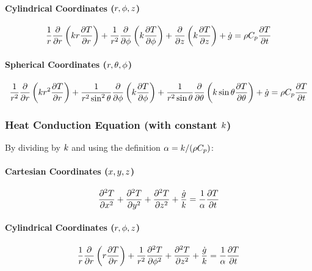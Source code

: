 \paragraph*{Cylindrical Coordinates ($r, \phi, z$)}
\begin{equation}
\label{eq:hce_cylindrical_variable_k_theory}
    \frac{1}{r} \frac{\partial}{\partial r}\left(k r \frac{\partial T}{\partial r}\right) + \frac{1}{r^2} \frac{\partial}{\partial \phi}\left(k \frac{\partial T}{\partial \phi}\right) + \frac{\partial}{\partial z}\left(k \frac{\partial T}{\partial z}\right) + \dot{g} = \rho C_p \frac{\partial T}{\partial t}
\end{equation}

\paragraph*{Spherical Coordinates ($r, \theta, \phi$)}
\begin{equation}
\label{eq:hce_spherical_variable_k_theory}
    \frac{1}{r^2} \frac{\partial}{\partial r}\left(k r^2 \frac{\partial T}{\partial r}\right) + \frac{1}{r^2 \sin^2 \theta} \frac{\partial}{\partial \phi}\left(k \frac{\partial T}{\partial \phi}\right) + \frac{1}{r^2 \sin \theta} \frac{\partial}{\partial \theta}\left(k \sin \theta \frac{\partial T}{\partial \theta}\right) + \dot{g} = \rho C_p \frac{\partial T}{\partial t}
\end{equation}

\subsubsection*{Heat Conduction Equation (with constant $k$)}
By dividing by $k$ and using the definition $\alpha = k/(\rho C_p)$:

\paragraph*{Cartesian Coordinates ($x, y, z$)}
\begin{equation}
\label{eq:hce_cartesian_constant_k_theory}
    \frac{\partial^2 T}{\partial x^2} + \frac{\partial^2 T}{\partial y^2} + \frac{\partial^2 T}{\partial z^2} + \frac{\dot{g}}{k} = \frac{1}{\alpha} \frac{\partial T}{\partial t}
\end{equation}

\paragraph*{Cylindrical Coordinates ($r, \phi, z$)}
\begin{equation}
\label{eq:hce_cylindrical_constant_k_theory}
    \frac{1}{r} \frac{\partial}{\partial r}\left(r \frac{\partial T}{\partial r}\right) + \frac{1}{r^2} \frac{\partial^2 T}{\partial \phi^2} + \frac{\partial^2 T}{\partial z^2} + \frac{\dot{g}}{k} = \frac{1}{\alpha} \frac{\partial T}{\partial t}
\end{equation}

